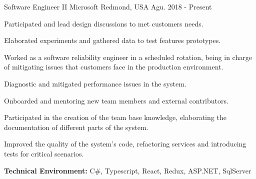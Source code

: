 
\begin{cventries}

\workexperienceentry
{Software Engineer II} %
{Microsoft} %
{Redmond, USA} %
{Agu. 2018 - Present} %
{ %
\begin{cvitems}
    \item {Participated and lead design discussions to met customers needs. }
    \item {Elaborated experiments and gathered data to test features prototypes.}
    \item {Worked as a software reliability engineer in a scheduled rotation, being in charge of mitigating issues that customers face in the production environment.} 
    \item {Diagnostic and mitigated performance issues in the system.}
    \item {Onboarded and mentoring new team members and external contributors.} 
    \item {Participated in the creation of the team base knowledge,  elaborating the documentation of different parts of the system.}
    \item {Improved the quality of the system's code, refactoring services and introducing tests for critical scenarios.}
\end{cvitems}
}
{\textbf{Technical Environment:} C\#, Typescript, React, Redux, ASP.NET, SqlServer}



\end{cventries}
